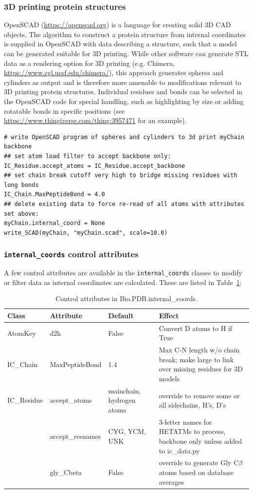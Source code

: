\subsubsection{3D printing protein structures}

OpenSCAD (\url{https://openscad.org}) is a language for creating solid 3D CAD objects.  
The algorithm to construct a protein structure from internal coordinates is supplied
in OpenSCAD with data describing a structure, such that a model can be generated suitable
for 3D printing.  While other software can generate STL data as a rendering option for
3D printing (e.g. Chimera, \url{https://www.cgl.ucsf.edu/chimera/}), this approach generates
spheres and cylinders as output and is therefore more amenable to modifications relevant to
3D printing protein structures.  Individual residues and bonds can be selected
in the OpenSCAD code for special handling, such as highlighting by size or adding
rotatable bonds in specific positions (see \url{https://www.thingiverse.com/thing:3957471}
for an example).

\begin{verbatim}
# write OpenSCAD program of spheres and cylinders to 3d print myChain backbone
## set atom load filter to accept backbone only:
IC_Residue.accept_atoms = IC_Residue.accept_backbone
## set chain break cutoff very high to bridge missing residues with long bonds
IC_Chain.MaxPeptideBond = 4.0
## delete existing data to force re-read of all atoms with attributes set above:
myChain.internal_coord = None
write_SCAD(myChain, "myChain.scad", scale=10.0)
\end{verbatim}

\subsubsection{\texttt{internal\_coords} control attributes}

A few control attributes are available in the \texttt{internal\_coords} classes to modify or
filter data as internal coordinates are calculated.  These are listed in Table~\ref{table:ic-attribs}:

\begin{table}
	\begin{tabular}{|l|l|l|l|}
		\hline
		Class&Attribute&Default&Effect\\
		\hline
		\hline
		AtomKey& d2h&False&Convert D atoms to H if True\\
		\hline
		IC\_Chain&MaxPeptideBond&1.4&Max C-N length w/o chain break; make large to link over missing residues for 3D models \\
		\hline
		IC\_Residue&accept\_atoms&mainchain, hydrogen atoms&override to remove some or all sidechains, H's, D's\\
		\hline
		&accept\_resnames&CYG, YCM, UNK&3-letter names for HETATMs to process, backbone only unless added to ic\_data.py \\
		\hline
		&gly\_Cbeta&False&override to generate Gly C$\beta$ atoms based on database averages \\
		\hline
	\end{tabular}
	\caption{Control attributes in Bio.PDB.internal\_coords.}
	\label{table:ic-attribs}
\end{table}

